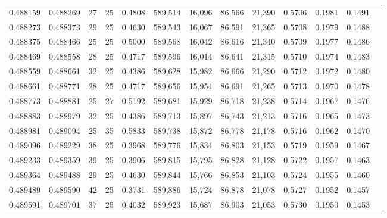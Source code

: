 \begin{tabular}{rrrrrrrrrrrrr}
0.488159 & 0.488269 &    27 &  25 &                                     0.4808 & 589,514 &  16,096 &  86,566 &  21,390 & 0.5706 & 0.1981 & 0.1491 \\
0.488273 & 0.488373 &    29 &  25 &                                     0.4630 & 589,543 &  16,067 &  86,591 &  21,365 & 0.5708 & 0.1979 & 0.1488 \\
0.488375 & 0.488466 &    25 &  25 &                                     0.5000 & 589,568 &  16,042 &  86,616 &  21,340 & 0.5709 & 0.1977 & 0.1486 \\
0.488469 & 0.488558 &    28 &  25 &                                     0.4717 & 589,596 &  16,014 &  86,641 &  21,315 & 0.5710 & 0.1974 & 0.1483 \\
0.488559 & 0.488661 &    32 &  25 &                                     0.4386 & 589,628 &  15,982 &  86,666 &  21,290 & 0.5712 & 0.1972 & 0.1480 \\
0.488661 & 0.488771 &    28 &  25 &                                     0.4717 & 589,656 &  15,954 &  86,691 &  21,265 & 0.5713 & 0.1970 & 0.1478 \\
0.488773 & 0.488881 &    25 &  27 &                                     0.5192 & 589,681 &  15,929 &  86,718 &  21,238 & 0.5714 & 0.1967 & 0.1476 \\
0.488883 & 0.488979 &    32 &  25 &                                     0.4386 & 589,713 &  15,897 &  86,743 &  21,213 & 0.5716 & 0.1965 & 0.1473 \\
0.488981 & 0.489094 &    25 &  35 &                                     0.5833 & 589,738 &  15,872 &  86,778 &  21,178 & 0.5716 & 0.1962 & 0.1470 \\
0.489096 & 0.489229 &    38 &  25 &                                     0.3968 & 589,776 &  15,834 &  86,803 &  21,153 & 0.5719 & 0.1959 & 0.1467 \\
0.489233 & 0.489359 &    39 &  25 &                                     0.3906 & 589,815 &  15,795 &  86,828 &  21,128 & 0.5722 & 0.1957 & 0.1463 \\
0.489364 & 0.489488 &    29 &  25 &                                     0.4630 & 589,844 &  15,766 &  86,853 &  21,103 & 0.5724 & 0.1955 & 0.1460 \\
0.489489 & 0.489590 &    42 &  25 &                                     0.3731 & 589,886 &  15,724 &  86,878 &  21,078 & 0.5727 & 0.1952 & 0.1457 \\
0.489591 & 0.489701 &    37 &  25 &                                     0.4032 & 589,923 &  15,687 &  86,903 &  21,053 & 0.5730 & 0.1950 & 0.1453 \\

\end{tabular}
